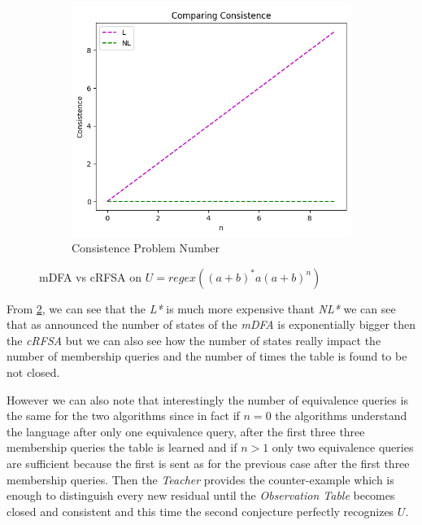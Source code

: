 \begin{figure}[!htb]
\begin{subfigure}[b]{0.3\textwidth}
    \includegraphics[width=\textwidth]{../statistics/plots/wrostDFA/Consistence.png}
    \caption{Consistence Problem Number}
    \label{fig:ConsistenceWrostDFACompare}
  \end{subfigure}
  \caption{mDFA vs cRFSA on $U = regex((a+b)^*a(a+b)^n)$}
  \label{fig:wrostDFA}
\end{figure}

From \cref{fig:wrostDFA}, we can see that the \textit{L*} is much more expensive thant \textit{NL*} we can see that as announced the number of states of the \textit{mDFA} is exponentially bigger then the \textit{cRFSA} but we can also see how the number of states really impact the number of membership queries and the number of times the table is found to be not closed.

However we can also note that interestingly the number of equivalence queries is the same for the two algorithms since in fact if $n = 0$ the algorithms understand the language after only one equivalence query, after the first three three membership queries the table is learned and if $n > 1$ only two equivalence queries are sufficient because the first is sent as for the previous case after the first three membership queries. Then the \textit{Teacher} provides the counter-example which is enough to distinguish every new residual until the \textit{Observation Table} becomes closed and consistent and this time the second conjecture perfectly recognizes $U$.

